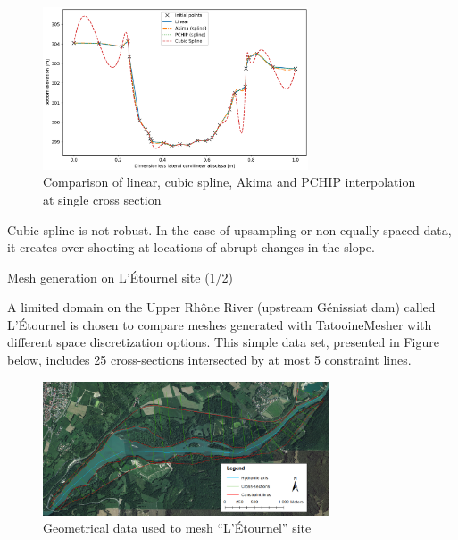 \documentclass[10pt]{beamer}
\begin{document}
\begin{frame}

\begin{figure}[H]
    \centering
        \includegraphics[width=0.7\textwidth]{figures/comp_lateral_interpolation.png}
        \caption{Comparison of linear, cubic spline, Akima and PCHIP interpolation at single cross section}
\end{figure}

Cubic spline is not robust. In the case of upsampling or non-equally spaced data, it creates over shooting at locations of abrupt changes in the slope.

\end{frame}


\begin{frame}{Mesh generation on L'Étournel site (1/2)}

A limited domain on the Upper Rhône River (upstream Génissiat dam) called L’Étournel is chosen to compare meshes generated with TatooineMesher with different space discretization options. This simple data set, presented in Figure below, includes 25 cross-sections intersected by at most 5 constraint lines.

\begin{figure}[H]
    \centering
    \includegraphics[width=8.5cm]{figures/map_Etournel.png}
    \caption{Geometrical data used to mesh “L’Étournel” site }
\end{figure}

\end{frame}
\end{document}
